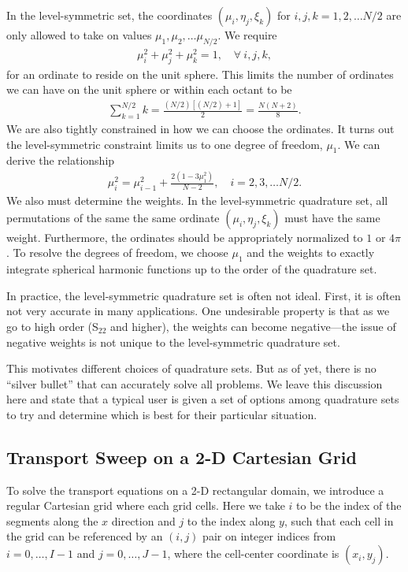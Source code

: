 In the level-symmetric set, the coordinates $(\mu_i,\eta_j,\xi_k)$ for $i,j,k = 1, 2, \ldots N/2$ are only allowed to take on values $\mu_1, \mu_2, \ldots \mu_{N/2}$. We require
\begin{align}
  \mu_i^2 + \mu_j^2 + \mu_k^2 = 1, \quad \forall \ i,j,k ,
\end{align}
for an ordinate to reside on the unit sphere. This limits the number of ordinates we can have on the unit sphere or within each octant to be
\begin{align}
  \sum_{k=1}^{N/2} k = \frac{ (N/2) [ (N/2) + 1 ] }{2} = \frac{ N ( N + 2 ) }{ 8 } .
\end{align}
We are also tightly constrained in how we can choose the ordinates. It turns out the level-symmetric constraint limits us to one degree of freedom, $\mu_1$. We can derive the relationship
\begin{align}
  \mu_i^2 = \mu_{i-1}^2 + \frac{ 2 ( 1 - 3 \mu_1^2 ) }{ N - 2 }, \quad i = 2, 3, \ldots N/2.
\end{align}
We also must determine the weights. In the level-symmetric quadrature set, all permutations of the same the same ordinate $(\mu_i,\eta_j,\xi_k)$ must have the same weight. Furthermore, the ordinates should be appropriately normalized to $1$ or $4\pi$.  To resolve the degrees of freedom, we choose $\mu_1$ and the weights to exactly integrate spherical harmonic functions up to the order of the quadrature set.

In practice, the level-symmetric quadrature set is often not ideal. First, it is often not very accurate in many applications. One undesirable property is that as we go to high order (S$_{22}$ and higher), the weights can become negative---the issue of negative weights is not unique to the level-symmetric quadrature set. 

This motivates different choices of quadrature sets. But as of yet, there is no ``silver bullet'' that can accurately solve all problems. We leave this discussion here and state that a typical user is given a set of options among quadrature sets to try and determine which is best for their particular situation. 





\subsection{Transport Sweep on a 2-D Cartesian Grid}

To solve the transport equations on a 2-D rectangular domain, we introduce a regular Cartesian grid where each grid cells. Here we take $i$ to be the index of the segments along the $x$ direction and $j$ to the index along $y$, such that each cell in the grid can be referenced by an $(i,j)$ pair on integer indices from $i = 0, \ldots, I-1$ and $j = 0, \ldots, J-1$, where the cell-center coordinate is $(x_i,y_j)$.


